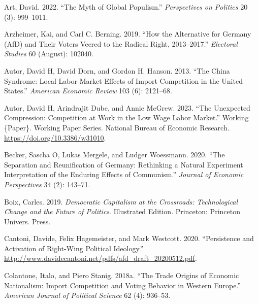 \documentclass[
]{article}
\newlength{\cslhangindent}
\newlength{\cslentryspacingunit} %
\newenvironment{CSLReferences}[2] %
 {%
  \setlength{\parindent}{0pt}
  \ifodd #1
  \let\oldpar\par
  \def\par{\hangindent=\cslhangindent\oldpar}
  \fi
  \setlength{\parskip}{#2\cslentryspacingunit}
 }%
 {}
\begin{document}
\hypertarget{refs}{}
\begin{CSLReferences}{1}{0}
\leavevmode{}%
Art, David. 2022. {``The {Myth} of {Global} {Populism}.''}
\emph{Perspectives on Politics} 20 (3): 999--1011.

\leavevmode{}%
Arzheimer, Kai, and Carl C. Berning. 2019. {``How the {Alternative} for
{Germany} ({AfD}) and Their Voters Veered to the Radical Right,
2013--2017.''} \emph{Electoral Studies} 60 (August): 102040.

\leavevmode{}%
Autor, David H, David Dorn, and Gordon H. Hanson. 2013. {``The {China}
{Syndrome}: {Local} {Labor} {Market} {Effects} of {Import} {Competition}
in the {United} {States}.''} \emph{American Economic Review} 103 (6):
2121--68.

\leavevmode{}%
Autor, David H, Arindrajit Dube, and Annie McGrew. 2023. {``The
{Unexpected} {Compression}: {Competition} at {Work} in the {Low} {Wage}
{Labor} {Market}.''} Working \{Paper\}. Working {Paper} {Series}.
National Bureau of Economic Research.
\url{https://doi.org/10.3386/w31010}.

\leavevmode{}%
Becker, Sascha O, Lukas Mergele, and Ludger Woessmann. 2020. {``The
Separation and Reunification of Germany: Rethinking a Natural Experiment
Interpretation of the Enduring Effects of Communism.''} \emph{Journal of
Economic Perspectives} 34 (2): 143--71.

\leavevmode{}%
Boix, Carles. 2019. \emph{Democratic {Capitalism} at the {Crossroads}:
{Technological} {Change} and the {Future} of {Politics}}. Illustrated
Edition. Princeton: Princeton Univers. Press.

\leavevmode{}%
Cantoni, Davide, Felix Hagemeister, and Mark Westcott. 2020.
{``Persistence and {Activation} of {Right}-{Wing} {Political}
{Ideology}.''}
\url{http://www.davidecantoni.net/pdfs/afd_draft_20200512.pdf}.

\leavevmode{}%
Colantone, Italo, and Piero Stanig. 2018a. {``The {Trade} {Origins} of
{Economic} {Nationalism}: {Import} {Competition} and {Voting} {Behavior}
in {Western} {Europe}.''} \emph{American Journal of Political Science}
62 (4): 936--53.


\end{CSLReferences}
\end{document}
